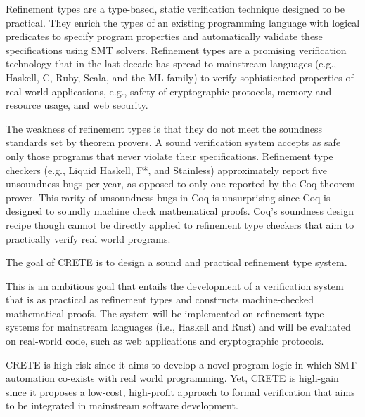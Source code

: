 Refinement types are a type-based, static verification technique designed to be practical. They enrich the types of an existing programming language with logical predicates to specify program properties and automatically validate these specifications using SMT solvers. Refinement types are a promising verification technology that in the last decade has spread to mainstream languages (e.g., Haskell, C, Ruby, Scala, and the ML-family) to verify sophisticated properties of real world applications, e.g., safety of cryptographic protocols, memory and resource usage, and web security. 

The weakness of refinement types is that they do not meet the soundness standards set by theorem provers. A sound verification system  accepts as safe only those programs that never violate their specifications. Refinement type checkers (e.g., Liquid Haskell, F*, and Stainless) approximately report five unsoundness bugs per year,  as opposed to only one reported by the Coq theorem prover. This rarity of unsoundness bugs in Coq is unsurprising since  Coq is designed to soundly machine check mathematical proofs. Coq's soundness design recipe though cannot be directly applied to refinement type checkers that aim to practically verify real world programs. 

The goal of CRETE is to design a sound and practical refinement type system.

This is an ambitious goal that entails the development of a verification system that is as practical as refinement types and constructs machine-checked mathematical proofs. The system will be implemented on refinement type systems for mainstream languages (i.e., Haskell and Rust) and will be evaluated on real-world code, such as web applications and cryptographic protocols. 

CRETE is high-risk since it aims to develop a novel program logic in which SMT automation co-exists with real world programming. Yet, CRETE is high-gain since it proposes a low-cost, high-profit approach to formal verification that aims to be integrated in mainstream software development.

